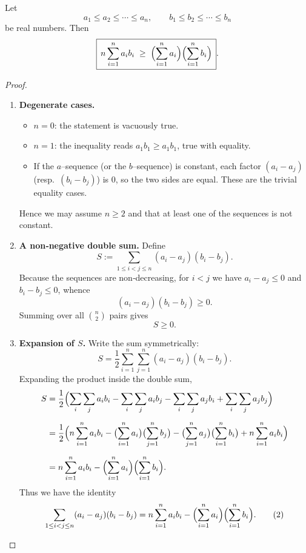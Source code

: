 \begin{theorem}
Let  
\[
a_{1}\le a_{2}\le\cdots\le a_{n},\qquad   
b_{1}\le b_{2}\le\cdots\le b_{n}
\]
be real numbers. Then  
\[
\boxed{\,n\sum_{i=1}^{n}a_i b_i\;\ge\;
\Bigl(\sum_{i=1}^{n}a_i\Bigr)\Bigl(\sum_{i=1}^{n}b_i\Bigr)\,}.
\]
\end{theorem}

\begin{proof}
\begin{enumerate}
\item \textbf{Degenerate cases.}
\begin{itemize}
\item $n=0$: the statement is vacuously true.
\item $n=1$: the inequality reads $a_{1}b_{1}\ge a_{1}b_{1}$, true with equality.
\item If the $a$–sequence (or the $b$–sequence) is constant, each factor $(a_i-a_j)$ (resp.\ $(b_i-b_j)$) is $0$, so the two sides are equal.  These are the trivial equality cases.
\end{itemize}
Hence we may assume $n\ge2$ and that at least one of the sequences is not constant.

\item \textbf{A non‑negative double sum.}  
Define  
\[
S:=\sum_{1\le i<j\le n}(a_i-a_j)(b_i-b_j).
\]
Because the sequences are non‑decreasing, for $i<j$ we have $a_i-a_j\le0$ and $b_i-b_j\le0$, whence  
\[
(a_i-a_j)(b_i-b_j)\ge0 .
\]
Summing over all $\binom{n}{2}$ pairs gives  
\[
S\ge0. \tag{1}
\]

\item \textbf{Expansion of $S$.}  Write the sum symmetrically:
\[
S=\frac12\sum_{i=1}^{n}\sum_{j=1}^{n}(a_i-a_j)(b_i-b_j).
\]
Expanding the product inside the double sum,
\begin{align*}
S&=\frac12\Bigl(
\sum_i\sum_j a_i b_i
-\sum_i\sum_j a_i b_j
-\sum_i\sum_j a_j b_i
+\sum_i\sum_j a_j b_j\Bigr)\\[2mm]
&=\frac12\Bigl(
n\sum_{i=1}^{n}a_i b_i
-\bigl(\sum_{i=1}^{n}a_i\bigr)\bigl(\sum_{j=1}^{n}b_j\bigr)
-\bigl(\sum_{j=1}^{n}a_j\bigr)\bigl(\sum_{i=1}^{n}b_i\bigr)
+n\sum_{i=1}^{n}a_i b_i\Bigr)\\[2mm]
&=n\sum_{i=1}^{n}a_i b_i-
\Bigl(\sum_{i=1}^{n}a_i\Bigr)\Bigl(\sum_{i=1}^{n}b_i\Bigr).
\end{align*}
Thus we have the identity
\[
\sum_{1\le i<j\le n}(a_i-a_j)(b_i-b_j)
=
n\sum_{i=1}^{n}a_i b_i-
\Bigl(\sum_{i=1}^{n}a_i\Bigr)\Bigl(\sum_{i=1}^{n}b_i\Bigr). \tag{2}
\]


\end{enumerate}
\end{proof}
